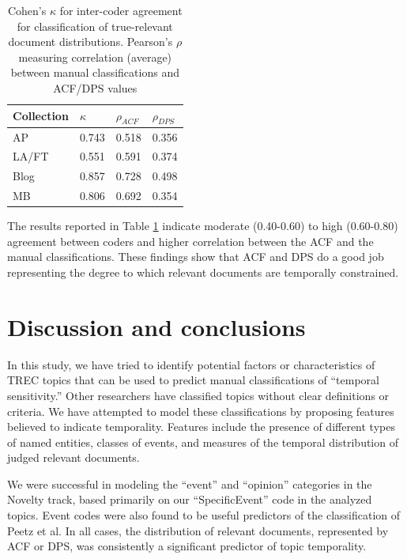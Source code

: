 \documentclass[runningheads,a4paper]{llncs}
\begin{document}
\begin{table}
\centering
\begin{tabular}{| l | l | l | l | } \hline
\bf{Collection} & \bf{$\kappa$}  & \bf{$\rho_{ACF}$} & \bf{$\rho_{DPS}$} \\ \hline
AP 	   & 0.743 & 0.518 & 0.356 \\ \hline
LA/FT & 0.551 & 0.591 & 0.374 \\ \hline
Blog    & 0.857 & 0.728 & 0.498 \\ \hline
MB      & 0.806 & 0.692 & 0.354 \\ \hline 
\end{tabular}
\caption{Cohen's $\kappa$ for inter-coder agreement for classification of true-relevant document distributions. Pearson's $\rho$ measuring correlation (average) between manual classifications and ACF/DPS values}
\label{table.cor}
\end{table}

The results reported in Table \ref{table.cor} indicate moderate (0.40-0.60) to high (0.60-0.80) agreement between coders and higher correlation between the ACF and the manual classifications. These findings show that ACF and DPS do a good job representing the degree to which relevant documents are temporally constrained. 



\section{Discussion and conclusions}

In this study, we have tried to identify potential factors or characteristics of TREC topics that can be used to predict manual classifications of ``temporal sensitivity.'' Other researchers have classified topics without clear definitions or criteria. We have attempted to model these classifications by proposing features believed to indicate temporality.  Features include the presence of different types of named entities, classes of events, and measures of the temporal distribution of judged relevant documents.

We were successful in modeling the ``event'' and ``opinion'' categories in the Novelty track, based primarily on our ``SpecificEvent'' code in the analyzed topics.  Event codes were also found to be useful predictors of the classification of Peetz et al. In all cases, the distribution of relevant documents, represented by ACF or DPS, was consistently a significant predictor of topic temporality. 
\end{document}
